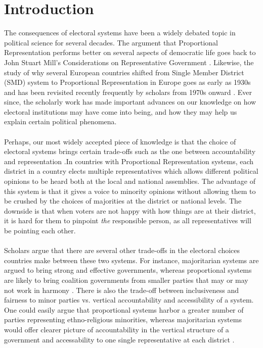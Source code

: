 \documentclass{article}
\begin{document}
\section{Introduction}
The consequences of electoral systems have been a widely debated topic in political science for several decades. The argument that Proportional Representation performs better on several aspects of democratic life goes back to John Stuart Mill's Considerations on  Representative Government \cite{mill1861considerations}. Likewise, the study of why several European countries shifted from Single Member District (SMD) system to Proportional Representation in Europe goes as early as 1930s \cite{braunias1932parlamentarische} and has been revisited recently frequently by scholars from 1970s onward \cite{rokkan_citizens_1970, boix_setting_1999, cusack_economic_2007}. Ever since, the scholarly work has made important advances on our knowledge on how electoral institutions may have come into being, and how they may help us explain certain political phenomena.\\

\\
Perhaps, our most widely accepted piece of knowledge is that the choice of electoral systems brings certain trade-offs such as the one between accountability and representation \cite{diamond1999developing,carey_electoral_2011,persson_economic_2003,britain1998report}.In countries with Proportional Representation systems, each district in a country elects multiple representatives which allows different political opinions to be heard both at the local and national assemblies. The advantage of this system is that it gives a voice to minority opinions without allowing them to be crushed by the choices of majorities at the district or national levels. The downside is that when voters are not happy with how things are at their district, it is hard for them to pinpoint \textit{the} responsible person, as all representatives will be pointing each other. \\
\\
Scholars argue that there are several other trade-offs in the electoral choices countries make between these two systems. For instance, majoritarian systems are argued to bring strong and effective governments, whereas proportional systems are likely to bring coalition governments from smaller parties that may or may not work in harmony \cite{norris1997choosing}. There is also the trade-off between inclusiveness and fairness to minor parties vs. vertical accountability and accessibility of a system\cite{norris1997choosing, diamond1999developing}. One could easily argue that proportional systems harbor a greater number of parties representing ethno-religious minorities, whereas majoritarian systems would offer clearer picture of accountability in the vertical structure of a government and accessability to one single representative at each district \cite{norris1997choosing, diamond1999developing}. \\
\end{document}
